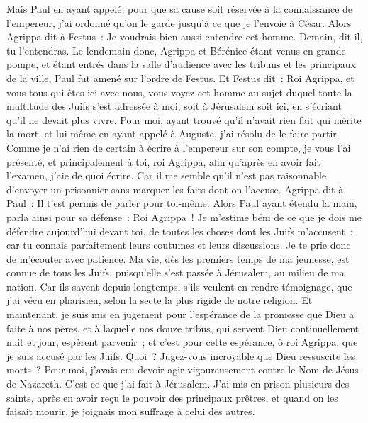 \begin{multicols}{2}
Mais Paul en ayant appelé, pour que sa cause soit réservée à la connaissance de l'empereur, j'ai ordonné qu'on le garde jusqu'à ce que je l'envoie à César.
Alors Agrippa dit à Festus~: Je voudrais bien aussi entendre cet homme. Demain, dit-il, tu l'entendras.
Le lendemain donc, Agrippa et Bérénice étant venus en grande pompe, et étant entrés dans la salle d'audience avec les tribuns et les principaux de la ville, Paul fut amené sur l'ordre de Festus.
Et Festus dit~: Roi Agrippa, et vous tous qui êtes ici avec nous, vous voyez cet homme au sujet duquel toute la multitude des Juifs s'est adressée à moi, soit à Jérusalem soit ici, en s'écriant qu'il ne devait plus vivre.
Pour moi, ayant trouvé qu'il n'avait rien fait qui mérite la mort, et lui-même en ayant appelé à Auguste, j'ai résolu de le faire partir.
Comme je n'ai rien de certain à écrire à l'empereur sur son compte, je vous l'ai présenté, et principalement à toi, roi Agrippa, afin qu'après en avoir fait l'examen, j'aie de quoi écrire.
Car il me semble qu'il n'est pas raisonnable d'envoyer un prisonnier sans marquer les faits dont on l'accuse.
\VerseOne{}Agrippa dit à Paul~: Il t'est permis de parler pour toi-même. Alors Paul ayant étendu la main, parla ainsi pour sa défense~:
Roi Agrippa~! Je m'estime béni de ce que je dois me défendre aujourd'hui devant toi, de toutes les choses dont les Juifs m'accusent~;
car tu connais parfaitement leurs coutumes et leurs discussions. Je te prie donc de m'écouter avec patience.
Ma vie, dès les premiers temps de ma jeunesse, est connue de tous les Juifs, puisqu'elle s'est passée à Jérusalem, au milieu de ma nation.
Car ils savent depuis longtemps, s'ils veulent en rendre témoignage, que j'ai vécu en pharisien, selon la secte la plus rigide de notre religion.
Et maintenant, je suis mis en jugement pour l'espérance de la promesse que Dieu a faite à nos pères,
et à laquelle nos douze tribus, qui servent Dieu continuellement nuit et jour, espèrent parvenir~; et c'est pour cette espérance, ô roi Agrippa, que je suis accusé par les Juifs.
Quoi~? Jugez-vous incroyable que Dieu ressuscite les morts~?
Pour moi, j'avais cru devoir agir vigoureusement contre le Nom de Jésus de Nazareth.
C'est ce que j'ai fait à Jérusalem. J'ai mis en prison plusieurs des saints, après en avoir reçu le pouvoir des principaux prêtres, et quand on les faisait mourir, je joignais mon suffrage à celui des autres.

\end{multicols}
